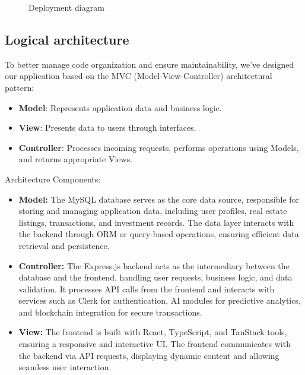 \begin{figure}[htbp]
    \centering
    \caption{Deployment diagram}
    \label{fig:physical-architecture}
\end{figure}

\subsection{Logical architecture}

To better manage code organization and ensure maintainability, we've designed our application based on the MVC (Model-View-Controller) \cite{SunardiMVC2019, GammaPatterns1994} architectural pattern:

\begin{itemize}
    \item \textbf{Model}: Represents application data and business logic.
    \item \textbf{View}: Presents data to users through interfaces.
    \item \textbf{Controller}: Processes incoming requests, performs operations using Models, and returns appropriate Views.
\end{itemize}

Architecture Components:
\begin{itemize}
    \item \textbf{Model:} The MySQL database serves as the core data source, responsible for storing and managing application data, including user profiles, real estate listings, transactions, and investment records. The data layer interacts with the backend through ORM or query-based operations, ensuring efficient data retrieval and persistence.
    
    \item \textbf{Controller:} The Express.js backend acts as the intermediary between the database and the frontend, handling user requests, business logic, and data validation. It processes API calls from the frontend and interacts with services such as Clerk for authentication, AI modules for predictive analytics, and blockchain integration for secure transactions.
    
    \item \textbf{View:} The frontend is built with React, TypeScript, and TanStack tools, ensuring a responsive and interactive UI. The frontend communicates with the backend via API requests, displaying dynamic content and allowing seamless user interaction.
\end{itemize}

